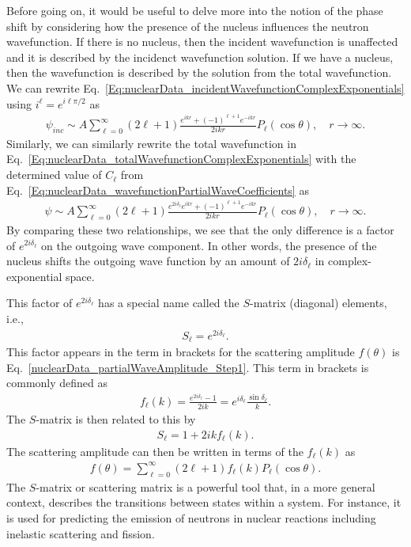 Before going on, it would be useful to delve more into the notion of the phase shift by considering how the presence of the nucleus influences the neutron wavefunction. If there is no nucleus, then the incident wavefunction is unaffected and it is described by the incidenct wavefunction solution. If we have a nucleus, then the wavefunction is described by the solution from the total wavefunction. We can rewrite Eq.~\eqref{Eq:nuclearData_incidentWavefunctionComplexExponentials} using $i^\ell = e^{i\ell \pi/2}$ as
\begin{align} 
  \psi_{inc} \sim A \sum_{\ell=0}^\infty ( 2 \ell + 1 )  \frac{ e^{ikr} + (-1)^{\ell+1} e^{-ikr} }{2ikr} P_\ell(\cos \theta) , \quad r \rightarrow \infty .
\end{align}
Similarly, we can similarly rewrite the total wavefunction in Eq.~\eqref{Eq:nuclearData_totalWavefunctionComplexExponentials} with the determined value of $C_\ell$ from Eq.~\eqref{Eq:nuclearData_wavefunctionPartialWaveCoefficients} as
\begin{align} 
  \psi \sim A \sum_{\ell=0}^\infty ( 2 \ell + 1 )  \frac{ e^{2i\delta_\ell} e^{ikr} + (-1)^{\ell+1} e^{-ikr} }{2ikr} P_\ell(\cos \theta) , \quad r \rightarrow \infty .
\end{align}
By comparing these two relationships, we see that the only difference is a factor of $e^{2i\delta_\ell}$ on the outgoing wave component. In other words, the presence of the nucleus shifts the outgoing wave function by an amount of $2i\delta_\ell$ in complex-exponential space.

This factor of $e^{2i\delta_\ell}$ has a special name called the $S$-matrix (diagonal) elements, i.e.,
\begin{align} \label{Eq:nuclearData:nuclearData_SmatrixDefinition}
  S_\ell = e^{2i\delta_\ell} .
\end{align}
This factor appears in the term in brackets for the scattering amplitude $f(\theta)$ is Eq.~\eqref{nuclearData_partialWaveAmplitude_Step1}. This term in brackets is commonly defined as
\begin{align} \label{Eq:nuclearData:nuclearData_fl_Smatrix}
  f_\ell(k) = \frac{ e^{2i\delta_\ell} - 1 }{ 2i k } = e^{i\delta_\ell}\frac{\sin\delta_\ell}{k}.
\end{align}
The $S$-matrix is then related to this by
\begin{align} \label{Eq:nuclearData_Smatrix_fl}
  S_\ell = 1 + 2 i k f_\ell(k) .
\end{align}
The scattering amplitude can then be written in terms of the $f_\ell(k)$ as
\begin{align} \label{nuclearData_partialWaveAmplitude}
  f(\theta) = \sum_{\ell = 0}^\infty ( 2\ell + 1 ) f_\ell(k) P_\ell(\cos\theta) .
\end{align}
The $S$-matrix or scattering matrix is a powerful tool that, in a more general context, describes the transitions between states within a system. For instance, it is used for predicting the emission of neutrons in nuclear reactions including inelastic scattering and fission. 

